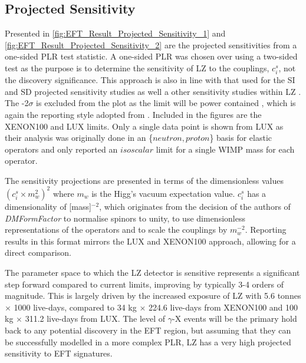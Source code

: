 \subsection{Projected Sensitivity}
\par
Presented in \autoref{fig:EFT_Result_Projected_Sensitivity_1} and \autoref{fig:EFT_Result_Projected_Sensitivity_2} are the projected sensitivities from a one-sided PLR test statistic.
A one-sided PLR was chosen over using a two-sided test as the purpose is to determine the sensitivity of LZ to the couplings, $c^s_i$, not the discovery significance. 
This approach is also in line with that used for the SI and SD projected sensitivity studies \cite{LZ_projected_sensitivity_paper_ref} as well a other sensitivity studies within LZ \cite{LZ_Ibles_LZStats_Thesis_ref, umituktu_thesis_ref}.
The -2$\sigma$ is excluded from the plot as the limit will be power contained \cite{power_constrained_limits_ref}, which is again the reporting style adopted from \cite{LZ_projected_sensitivity_paper_ref}.
Included in the figures are the XENON100 \cite{xenon100_eft_ref} and LUX \cite{LUX_RUN4_EFT_2021} limits.
Only a single data point is shown from LUX as their analysis was originally done in an \{$neutron,proton$\} basis for elastic operators and only reported an $isoscalar$ limit for a single WIMP mass for each operator.
\par
The sensitivity projections are presented in terms of the dimensionless values $({c}^{s}_{i}\times{m}^{2}_{w})^{2}$ where $m_w$ is the Higg's vacuum expectation value.
${c}^{s}_{i}$ has a dimensionality of [mass]$^{-2}$, which originates from the decision of the authors of \textit{DMFormFactor} to normalise spinors to unity, to use dimensionless representations of the operators and to scale the couplings by $m^{-2}_w$.
Reporting results in this format mirrors the LUX and XENON100 approach, allowing for a direct comparison.
\par
The parameter space to which the LZ detector is sensitive represents a significant step forward compared to current limits, improving by typically 3-4 orders of magnitude.
This is largely driven by the increased exposure of LZ with 5.6 tonnes $\times$ 1000 live-days, compared to 34 kg $\times$ 224.6 live-days from XENON100 and 100 kg $\times$ 311.2 live-days from LUX.
The level of $\gamma$-X events will be the primary hold back to any potential discovery in the EFT region, but assuming that they can be successfully modelled in a more complex PLR, LZ has a very high projected sensitivity to EFT signatures.

